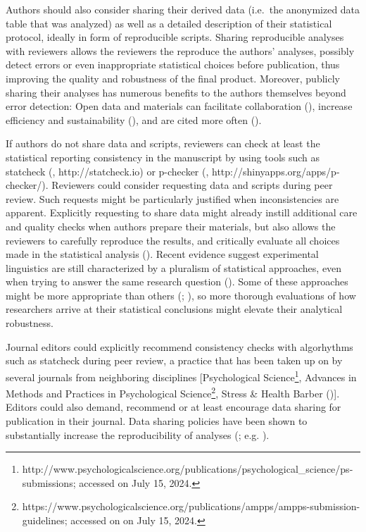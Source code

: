 \documentclass[
  doc,
  longtable,
  nolmodern,
  notxfonts,
  notimes,
  colorlinks=true,linkcolor=blue,citecolor=blue,urlcolor=blue]{apa7}
\begin{document}
Authors should also consider sharing their derived data (i.e.~the
anonymized data table that was analyzed) as well as a detailed
description of their statistical protocol, ideally in form of
reproducible scripts. Sharing reproducible analyses with reviewers
allows the reviewers the reproduce the authors' analyses, possibly
detect errors or even inappropriate statistical choices before
publication, thus improving the quality and robustness of the final
product. Moreover, publicly sharing their analyses has numerous benefits
to the authors themselves beyond error detection: Open data and
materials can facilitate collaboration
(), increase efficiency
and sustainability (), and are cited more often
().

If authors do not share data and scripts, reviewers can check at least
the statistical reporting consistency in the manuscript by using tools
such as statcheck (, http://statcheck.io) or p-checker
(,
http://shinyapps.org/apps/p-checker/). Reviewers could consider
requesting data and scripts during peer review. Such requests might be
particularly justified when inconsistencies are apparent. Explicitly
requesting to share data might already instill additional care and
quality checks when authors prepare their materials, but also allows the
reviewers to carefully reproduce the results, and critically evaluate
all choices made in the statistical analysis
(). Recent
evidence suggest experimental linguistics are still characterized by a
pluralism of statistical approaches, even when trying to answer the same
research question (). Some of these approaches might be more appropriate than
others (; ), so
more thorough evaluations of how researchers arrive at their statistical
conclusions might elevate their analytical robustness.

Journal editors could explicitly recommend consistency checks with
algorhythms such as statcheck during peer review, a practice that has
been taken up on by several journals from neighboring disciplines
{[}Psychological Science\footnote{http://www.psychologicalscience.org/publications/psychological\_science/ps-submissions;
  accessed on July 15, 2024.}, Advances in Methods and Practices in
Psychological Science\footnote{https://www.psychologicalscience.org/publications/ampps/ampps-submission-guidelines;
  accessed on on July 15, 2024.}, Stress \& Health Barber
(){]}. Editors could also
demand, recommend or at least encourage data sharing for publication in
their journal. Data sharing policies have been shown to substantially
increase the reproducibility of analyses
(; e.g.
).
\end{document}
